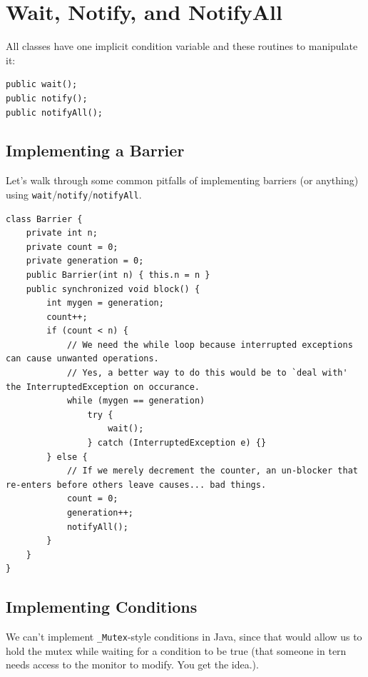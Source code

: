             \section{Wait, Notify, and NotifyAll} %
            \label{sec:wait_notify_and_notifyall}
                All classes have one implicit condition variable and these routines to manipulate it:
                \begin{lstlisting}
public wait();
public notify();
public notifyAll();
                \end{lstlisting}
                \subsection{Implementing a Barrier} %
                \label{sub:implementing_a_barrier}
                    Let's walk through some common pitfalls of implementing barriers (or anything) using \verb|wait|/\verb|notify|/\verb|notifyAll|.

                    \begin{lstlisting}
class Barrier {
    private int n;
    private count = 0;
    private generation = 0;
    public Barrier(int n) { this.n = n }
    public synchronized void block() {
        int mygen = generation;
        count++;
        if (count < n) {
            // We need the while loop because interrupted exceptions can cause unwanted operations.
            // Yes, a better way to do this would be to `deal with' the InterruptedException on occurance.
            while (mygen == generation)
                try {
                    wait();
                } catch (InterruptedException e) {}
        } else {
            // If we merely decrement the counter, an un-blocker that re-enters before others leave causes... bad things.
            count = 0;
            generation++;
            notifyAll();
        }
    }
}
                    \end{lstlisting}
                \subsection{Implementing Conditions} %
                \label{sub:implementing_conditions}
                    We can't implement \verb|_Mutex|-style conditions in Java, since that would allow us to hold the mutex while waiting for a condition to be true (that someone in tern needs access to the monitor to modify. You get the idea.).
